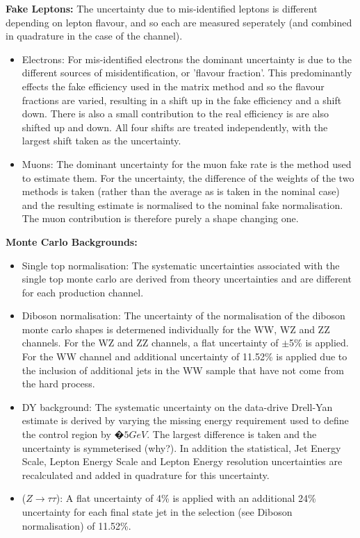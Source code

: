 \vspace{5mm}

\noindent
\textbf{Fake Leptons:}
The uncertainty due to mis-identified leptons is different depending on lepton flavour, and so each are measured seperately (and combined in quadrature in the case of the \emu channel). 

\begin{itemize}
    \item Electrons: For mis-identified electrons the dominant uncertainty is due to the different sources of misidentification, or 'flavour fraction'. This predominantly effects the fake efficiency used in the matrix method and so the flavour fractions are varied, resulting in a shift up in the fake efficiency and a shift down. There is also a small contribution to the real efficiency is are also shifted up and down. All four shifts are treated independently, with the largest shift taken as the uncertainty.
    \item Muons: The dominant uncertainty for the muon fake rate is the method used to estimate them. For the uncertainty, the difference of the weights of the two methods is taken (rather than the average as is taken in the nominal case) and the resulting estimate is normalised to the nominal fake normalisation. The muon contribution is therefore purely a shape changing one.
\end{itemize}

\vspace{5mm}
\noindent
\textbf{Monte Carlo Backgrounds:}
\begin{itemize}
    \item Single top normalisation: The systematic uncertainties associated with the single top monte carlo are derived from theory uncertainties and are different for each production channel. 
    \item Diboson normalisation: The uncertainty of the normalisation of the diboson monte carlo shapes is determened individually for the WW, WZ and ZZ channels. For the WZ and ZZ channels, a flat uncertainty of $\pm$5\% is applied. For the WW channel and additional uncertainty of 11.52\% is applied due to the inclusion of additional jets in the WW sample that have not come from the hard process. 
    \item DY background: The systematic uncertainty on the data-drive Drell-Yan estimate is derived by varying the missing energy requirement used to define the control region by $�5 GeV$. The largest difference is taken and the uncertainty is symmeterised (why?). In addition the statistical, Jet Energy Scale, Lepton Energy Scale and Lepton Energy resolution uncertainties are recalculated and added in quadrature for this uncertainty. 
    \item ($Z\rightarrow\tau\tau$): A flat uncertainty of 4\% is applied with an additional 24\% uncertainty for each final state jet in the selection (see Diboson normalisation) of 11.52\%.
\end{itemize}

